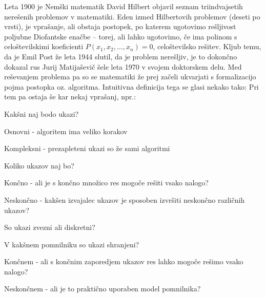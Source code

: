 \documentclass[10pt,a4paper,oneside]{book}
\begin{document}



%

%


Leta 1900 je Nemški matematik David Hilbert objavil seznam triindvajsetih nerešenih problemov v matematiki. Eden izmed Hilbertovih problemov (deseti po vrsti), je vprašanje, ali obstaja postopek, po katerem ugotovimo rešljivost poljubne Diofantske enačbe -- torej, ali lahko ugotovimo, če ima polinom s celoštevilskimi koeficienti $P(x_1, x_2, \dots, x_n)=0$, celoštevilsko rešitev.
Kljub temu, da je Emil Post že leta 1944 slutil, da je problem nerešljiv, je to dokončno dokazal rus Jurij Matijaševič šele leta 1970 v svojem doktorskem delu. Med reševanjem problema pa so se matematiki že prej začeli ukvarjati s formalizacijo pojma postopka oz. algoritma. Intuitivna definicija tega se glasi nekako tako:
Pri tem pa ostaja še kar nekaj vprašanj, npr.:
\begin{items}
\item Kakšni naj bodo ukazi? 
	\begin{items}
	\item Osnovni - algoritem ima veliko korakov
	\item Kompleksni - prezapleteni ukazi so že sami algoritmi
	\end{items}
\item Koliko ukazov naj bo?
	\begin{items}
	\item Končno - ali je s končno množico res mogoče rešiti vsako nalogo?
	\item Neskončno - kakšen izvajalec ukazov je sposoben izvršiti neskončno različnih ukazov?
	\end{items}
\item So ukazi zvezni ali diskretni?
\item V kakšnem pomnilniku so ukazi shranjeni?
	\begin{items}%
	\item Končnem - ali s končnim zaporedjem ukazov res lahko mogoče rešimo vsako nalogo?
	\item Neskončnem - ali je to praktično uporaben model pomnilnika?
	\end{items}
\end{items}
\end{document}
